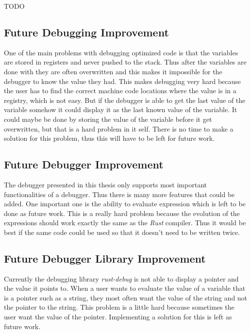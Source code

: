 
TODO



\subsection{Future Debugging Improvement}
One of the main problems with debugging optimized code is that the variables are stored in registers and never pushed to the stack.
Thus after the variables are done with they are often overwritten and this makes it impossible for the debugger to know the value they had.
This makes debugging very hard because the user has to find the correct machine code locations where the value is in a registry, which is not easy.
But if the debugger is able to get the last value of the variable somehow it could display it as the last known value of the variable.
It could maybe be done by storing the value of the variable before it get overwritten, but that is a hard problem in it self.
There is no time to make a solution for this problem, thus this will have to be left for future work.


\subsection{Future Debugger Improvement}
The debugger presented in this thesis only supports most important functionalities of a debugger.
Thus there is many more features that could be added.
One important one is the ability to evaluate expression which is left to be done as future work.
This is a really hard problem because the evolution of the expressions should work exactly the same as the \emph{Rust} compiler.
Thus it would be best if the same code could be used so that it doesn't need to be written twice.


\subsection{Future Debugger Library Improvement}
Currently the debugging library \emph{rust-debug} is not able to display a pointer and the value it points to.
When a user wants to evaluate the value of a variable that is a pointer such as a string, they most often want the value of the string and not the pointer to the string.
This problem is a little hard because sometimes the user want the value of the pointer.
Implementing a solution for this is left as future work.


